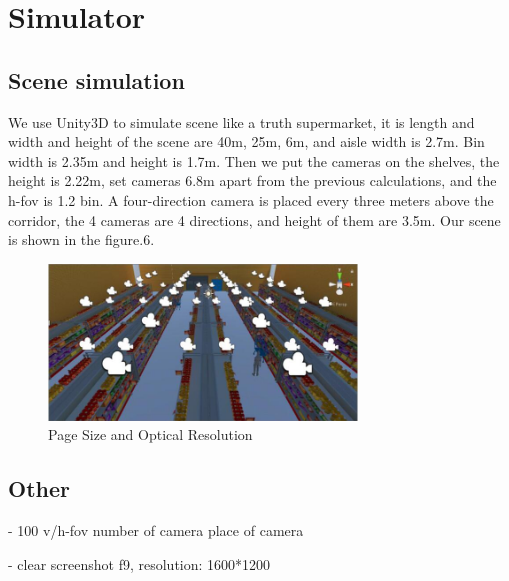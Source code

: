 \section{Simulator}


\subsection{Scene simulation}

We use Unity3D to simulate scene like a truth supermarket, it is length and width and height of the scene are 40m, 25m, 6m, and aisle width is 2.7m.
Bin width is 2.35m and height is 1.7m.
Then we put the cameras on the shelves, the height is 2.22m, set cameras 6.8m apart from the previous calculations, and the h-fov is 1.2 bin.
A four-direction camera is placed every three meters above the corridor, the 4 cameras are 4 directions, and height of them are 3.5m.
Our scene is shown in the figure.6.
\begin{figure}[htbp]
\centerline{\includegraphics[width=8.2cm,scale=0.9]{supermarket.jpg}}
\caption{Page Size and Optical Resolution}
\label{fig}
\end{figure}



\subsection{Other}
- 100%
v/h-fov
number of camera
place of camera

- clear screenshot f9, resolution: 1600*1200
